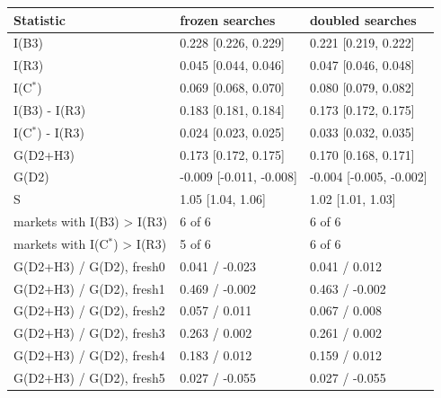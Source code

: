 \begin{tabular}{lll}
\hline
Statistic & frozen searches & doubled searches \\
\hline
I(B3) & 0.228 [0.226, 0.229] & 0.221 [0.219, 0.222] \\
I(R3) & 0.045 [0.044, 0.046] & 0.047 [0.046, 0.048] \\
I(C$^*$) & 0.069 [0.068, 0.070] & 0.080 [0.079, 0.082] \\
I(B3) - I(R3) & 0.183 [0.181, 0.184] & 0.173 [0.172, 0.175] \\
I(C$^*$) - I(R3) & 0.024 [0.023, 0.025] & 0.033 [0.032, 0.035] \\
G(D2+H3) & 0.173 [0.172, 0.175] & 0.170 [0.168, 0.171] \\
G(D2) & -0.009 [-0.011, -0.008] & -0.004 [-0.005, -0.002] \\
S & 1.05 [1.04, 1.06] & 1.02 [1.01, 1.03] \\
markets with I(B3) > I(R3) & 6 of 6 & 6 of 6 \\
markets with I(C$^*$) > I(R3) & 5 of 6 & 6 of 6 \\
\hline
G(D2+H3) / G(D2), fresh0 & 0.041 / -0.023 & 0.041 / 0.012 \\
G(D2+H3) / G(D2), fresh1 & 0.469 / -0.002 & 0.463 / -0.002 \\
G(D2+H3) / G(D2), fresh2 & 0.057 / 0.011 & 0.067 / 0.008 \\
G(D2+H3) / G(D2), fresh3 & 0.263 / 0.002 & 0.261 / 0.002 \\
G(D2+H3) / G(D2), fresh4 & 0.183 / 0.012 & 0.159 / 0.012 \\
G(D2+H3) / G(D2), fresh5 & 0.027 / -0.055 & 0.027 / -0.055 \\
\hline
\end{tabular}
